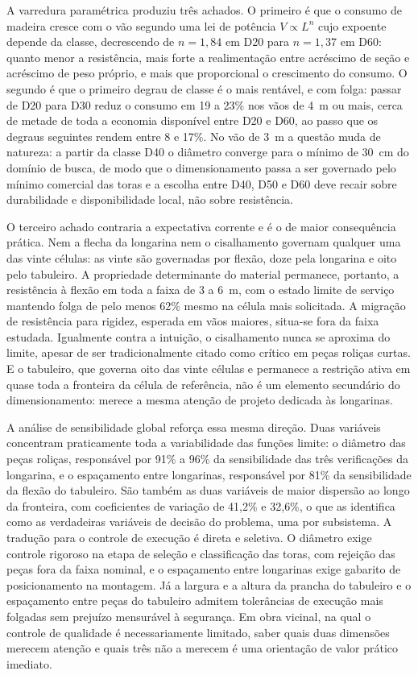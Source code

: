 A varredura paramétrica produziu três achados.
O primeiro é que o consumo de madeira cresce com o vão segundo uma lei de potência $V \propto L^{n}$ cujo expoente depende da classe, decrescendo de $n = 1{,}84$ em D20 para $n = 1{,}37$ em D60: quanto menor a resistência, mais forte a realimentação entre acréscimo de seção e acréscimo de peso próprio, e mais que proporcional o crescimento do consumo.
O segundo é que o primeiro degrau de classe é o mais rentável, e com folga: passar de D20 para D30 reduz o consumo em 19 a 23\% nos vãos de 4~m ou mais, cerca de metade de toda a economia disponível entre D20 e D60, ao passo que os degraus seguintes rendem entre 8 e 17\%.
No vão de 3~m a questão muda de natureza: a partir da classe D40 o diâmetro converge para o mínimo de 30~cm do domínio de busca, de modo que o dimensionamento passa a ser governado pelo mínimo comercial das toras e a escolha entre D40, D50 e D60 deve recair sobre durabilidade e disponibilidade local, não sobre resistência.

O terceiro achado contraria a expectativa corrente e é o de maior consequência prática.
Nem a flecha da longarina nem o cisalhamento governam qualquer uma das vinte células: as vinte são governadas por flexão, doze pela longarina e oito pelo tabuleiro.
A propriedade determinante do material permanece, portanto, a resistência à flexão em toda a faixa de 3 a 6~m, com o estado limite de serviço mantendo folga de pelo menos 62\% mesmo na célula mais solicitada.
A migração de resistência para rigidez, esperada em vãos maiores, situa-se fora da faixa estudada.
Igualmente contra a intuição, o cisalhamento nunca se aproxima do limite, apesar de ser tradicionalmente citado como crítico em peças roliças curtas.
E o tabuleiro, que governa oito das vinte células e permanece a restrição ativa em quase toda a fronteira da célula de referência, não é um elemento secundário do dimensionamento: merece a mesma atenção de projeto dedicada às longarinas.

A análise de sensibilidade global reforça essa mesma direção.
Duas variáveis concentram praticamente toda a variabilidade das funções limite: o diâmetro das peças roliças, responsável por 91\% a 96\% da sensibilidade das três verificações da longarina, e o espaçamento entre longarinas, responsável por 81\% da sensibilidade da flexão do tabuleiro.
São também as duas variáveis de maior dispersão ao longo da fronteira, com coeficientes de variação de 41{,}2\% e 32{,}6\%, o que as identifica como as verdadeiras variáveis de decisão do problema, uma por subsistema.
A tradução para o controle de execução é direta e seletiva.
O diâmetro exige controle rigoroso na etapa de seleção e classificação das toras, com rejeição das peças fora da faixa nominal, e o espaçamento entre longarinas exige gabarito de posicionamento na montagem.
Já a largura e a altura da prancha do tabuleiro e o espaçamento entre peças do tabuleiro admitem tolerâncias de execução mais folgadas sem prejuízo mensurável à segurança.
Em obra vicinal, na qual o controle de qualidade é necessariamente limitado, saber quais duas dimensões merecem atenção e quais três não a merecem é uma orientação de valor prático imediato.

